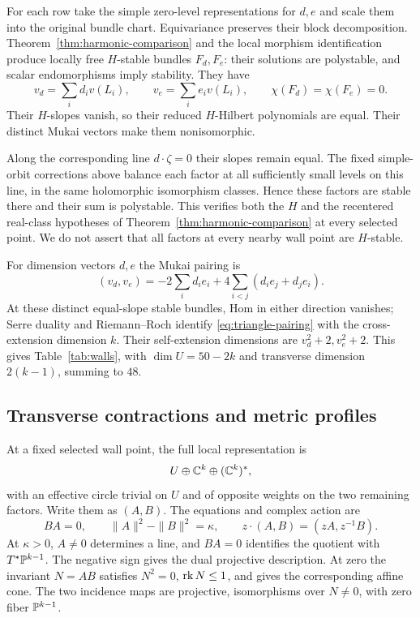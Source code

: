 For each row take the simple zero-level representations for $d,e$
and scale them into the original bundle chart.
Equivariance preserves their block decomposition.
Theorem~\ref{thm:harmonic-comparison} and the local morphism
identification produce locally free $H$-stable bundles $F_d,F_e$:
their solutions are polystable, and scalar endomorphisms imply
stability. They have
\[
 v_d=\sum_i d_iv(L_i),\qquad v_e=\sum_i e_iv(L_i),\qquad
 \chi(F_d)=\chi(F_e)=0.
\]
Their $H$-slopes vanish, so their reduced $H$-Hilbert polynomials
are equal. Their distinct Mukai vectors make them nonisomorphic.

Along the corresponding line $d\cdot\zeta=0$ their slopes remain
equal. The fixed simple-orbit corrections above balance each
factor at all sufficiently small levels on this line, in the
same holomorphic isomorphism classes. Hence these factors are
stable there and their sum is polystable.
This verifies both the $H$ and the recentered real-class hypotheses
of Theorem~\ref{thm:harmonic-comparison} at every selected point.
We do not assert that all factors at every nearby wall point
are $H$-stable.

For dimension vectors $d,e$ the Mukai pairing is
\begin{equation}\label{eq:triangle-pairing}
 (v_d,v_e)=-2\sum_i d_ie_i
       +4\sum_{i<j}(d_ie_j+d_je_i).
\end{equation}
At these distinct equal-slope stable bundles, Hom in either
direction vanishes; Serre duality and Riemann--Roch identify
\eqref{eq:triangle-pairing} with the cross-extension dimension $k$.
Their self-extension dimensions are $v_d^2+2,v_e^2+2$.
This gives Table~\ref{tab:walls}, with
$\dim U=50-2k$ and transverse dimension $2(k-1)$, summing to $48$.

\subsection{Transverse contractions and metric profiles}
At a fixed selected wall point, the full local representation is
\[
 U\oplus\mathbb C^k\oplus(\mathbb C^k)^*,
\]
with an effective circle trivial on $U$ and of opposite weights
on the two remaining factors. Write them as $(A,B)$.
The equations and complex action are
\[
 BA=0,\qquad \|A\|^2-\|B\|^2=\kappa,\qquad
 z\cdot(A,B)=(zA,z^{-1}B).
\]
At $\kappa>0$, $A\ne0$ determines a line, and $BA=0$ identifies
the quotient with $T^*\mathbb P^{k-1}$.
The negative sign gives the dual projective description.
At zero the invariant $N=AB$ satisfies
$N^2=0$, $\operatorname{rk} N\le1$, and gives the corresponding affine cone.
The two incidence maps are projective, isomorphisms over
$N\ne0$, with zero fiber $\mathbb P^{k-1}$.

